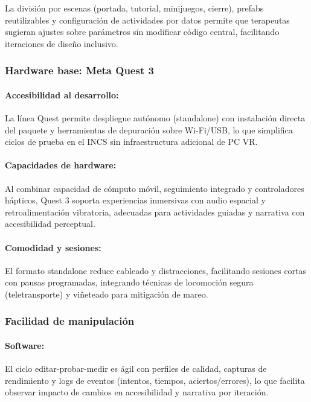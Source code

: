 La división por escenas (portada, tutorial, minijuegos, cierre), prefabs reutilizables y configuración de actividades por datos permite que terapeutas sugieran ajustes sobre parámetros sin modificar código central, facilitando iteraciones de diseño inclusivo.

\subsubsection{Hardware base: Meta Quest 3}

\paragraph{Accesibilidad al desarrollo:}
La línea Quest permite despliegue autónomo (standalone) con instalación directa del paquete y herramientas de depuración sobre Wi-Fi/USB, lo que simplifica ciclos de prueba en el INCS sin infraestructura adicional de PC VR.

\paragraph{Capacidades de hardware:}
Al combinar capacidad de cómputo móvil, seguimiento integrado y controladores hápticos, Quest 3 soporta experiencias inmersivas con audio espacial y retroalimentación vibratoria, adecuadas para actividades guiadas y narrativa con accesibilidad perceptual.

\paragraph{Comodidad y sesiones:}
El formato standalone reduce cableado y distracciones, facilitando sesiones cortas con pausas programadas, integrando técnicas de locomoción segura (teletransporte) y viñeteado para mitigación de mareo.

\subsubsection{Facilidad de manipulación}

\paragraph{Software:}
El ciclo editar-probar-medir es ágil con perfiles de calidad, capturas de rendimiento y logs de eventos (intentos, tiempos, aciertos/errores), lo que facilita observar impacto de cambios en accesibilidad y narrativa por iteración.

